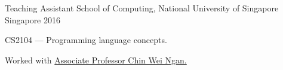 \begin{cventries}
  \cventry
    {Teaching Assistant} %
    {School of Computing, National University of Singapore} %
    {Singapore} %
    {2016} %
    {
      \begin{cvitems} %
        \item CS2104 --- Programming language concepts.
        \item Worked with \href{https://www.comp.nus.edu.sg/~chinwn/}{Associate Professor Chin Wei Ngan.}
      \end{cvitems}
    }





\end{cventries}
